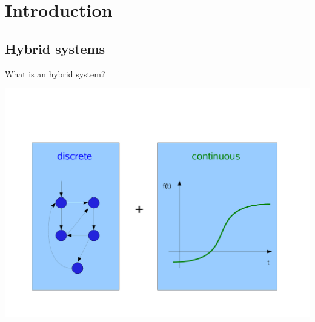

\section{Introduction}
\subsection{Hybrid systems}
\begin{frame}{What is an hybrid system?}
\begin{center}
\vspace*{-1.5cm}
\includegraphics[width=\columnwidth]{images/cs.pdf}
\end{center}
\end{frame}

